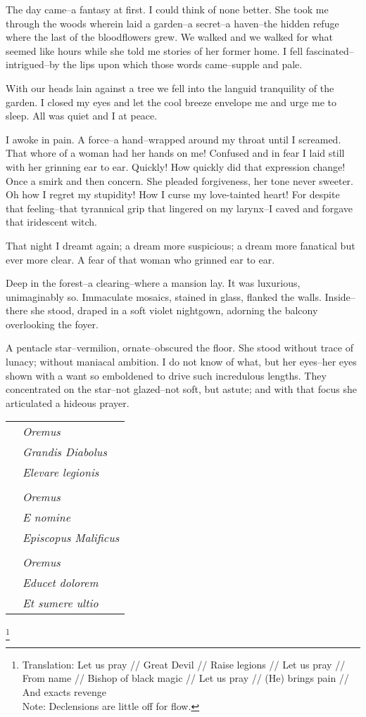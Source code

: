 \documentclass{article}
\begin{document}
\noindent %
The day came--a fantasy at first.
I could think of none better. %
She took me through the woods wherein laid a garden--a
secret--a haven--the hidden refuge where
the last of the bloodflowers grew.
We walked and we walked for what seemed like hours
while she told me stories of her former home.
I fell fascinated--intrigued--by the lips
upon which those words came--supple and pale.


With our heads lain against a tree we
fell into the languid tranquility of the garden.
I closed my eyes and let the cool breeze envelope me
and urge me to sleep. All was quiet and I at peace.


I awoke in pain.
A force--a hand--wrapped around my throat until I screamed.
That whore of a woman had her hands on me!
Confused and in fear I laid still
with her grinning ear to ear.
Quickly! How quickly did that expression change!
Once a smirk and then concern.
She pleaded forgiveness, her tone never sweeter.
Oh how I regret my stupidity!
How I curse my love-tainted heart!
For despite that feeling--that
tyrannical grip that lingered on my larynx--I
caved and forgave that iridescent witch.


That night I dreamt again; a dream more suspicious;
a dream more fanatical but ever more clear.
A fear of that woman who grinned ear to ear. %
\vvvv


\noindent
Deep in the forest--a clearing--where a mansion lay.
It was luxurious, unimaginably so.
Immaculate mosaics, stained in glass, flanked the walls.
Inside--there she stood, draped in a soft violet nightgown,
adorning the balcony overlooking the foyer.


A pentacle star--vermilion, ornate--obscured the floor.
She stood without trace of lunacy;
without maniacal ambition.
I do not know of what, but her eyes--her eyes
shown with a want so emboldened to drive
such incredulous lengths.
They concentrated on the star--not
glazed--not soft, but astute; and with
that focus she articulated a hideous prayer.
\VV


\singlespace
\begin{tabular}{ll}
& \textit{Oremus} \\
& \textit{Grandis Diabolus} \\
& \textit{Elevare legionis} \\
& \\
& \textit{Oremus} \\
& \textit{E nomine} \\
& \textit{Episcopus Malificus} \\
& \\
& \textit{Oremus} \\
& \textit{Educet dolorem} \\
& \textit{Et sumere ultio} \\
\end{tabular}\revertspace\footnote{
Translation:
Let us pray // Great Devil // Raise legions //
Let us pray // From name // Bishop of black magic //
Let us pray // (He) brings pain // And exacts revenge \\
\indent
Note: Declensions are little off for flow.
} \vspace*{3ex}
\end{document}
